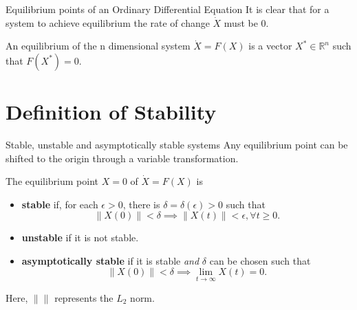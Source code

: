 \documentclass{beamer}
\begin{document}
\begin{frame}{Equilibrium points of an Ordinary Differential Equation}
    It is clear that for a system to achieve equilibrium the rate of change $\dot{X}$ must be $0$.
\begin{definition}
    An equilibrium of the n dimensional system $\dot{X} = F(X)$ is a vector $X^* \in \mathbb{R}^n$  such that $F(X^*)=0.$
\end{definition}
\end{frame}


\section{Definition of Stability}
\begin{frame}{Stable, unstable and asymptotically stable systems}
Any equilibrium point can be shifted to the origin through a variable transformation.
    \begin{definition}
    The equilibrium point $X=0$ of $\dot{X}=F(X)$ is
    \begin{itemize}
        \item \textbf{stable} if, for each $\epsilon > 0$, there is $\delta = \delta(\epsilon)>0$ such that
        $$\|X(0)\|<\delta \implies \|X(t)\|<\epsilon, \forall t\geq 0.$$

        \item \textbf{unstable} if it is not stable.

        \item \textbf{asymptotically stable} if it is stable \emph{and} $\delta$ can be chosen such that
        $$\|X(0)\|<\delta \implies \lim_{t \to \infty} X(t)=0.$$
    \end{itemize}
\end{definition}
Here, $\|\|$ represents the $L_2$ norm.
\end{frame}
\end{document}

